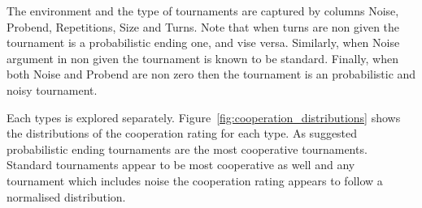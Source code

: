 \documentclass{article}
\begin{document}
The environment and the type of tournaments are captured by columns Noise, Probend,
Repetitions, Size and Turns. Note that when turns are non given the tournament is a
probabilistic ending one, and vise versa. Similarly, when Noise argument in non given
the tournament is known to be standard. Finally, when both Noise and Probend are
non zero then the tournament is an probabilistic and noisy tournament.

\begin{table}[htpb]
    \centering
    \caption{Result Set}
    \label{table:result_set}
\end{table}

Each types is explored separately. Figure~\ref{fig:cooperation_distributions} shows
the distributions of the cooperation rating for each type. As suggested probabilistic
ending tournaments are the most cooperative tournaments. Standard tournaments
appear to be most cooperative as well and any tournament which includes noise
the cooperation rating appears to follow a normalised distribution.
\end{document}
